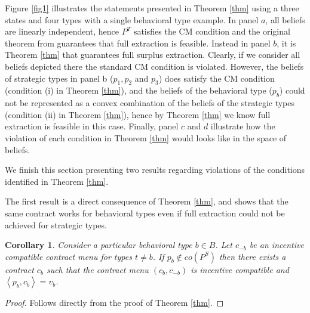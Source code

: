 \documentclass[12pt]{article}
\newtheorem{corollary}{Corollary}
\begin{document}
Figure \ref{fig1} illustrates the statements presented in Theorem \ref{thm} using a three states and four types with a single behavioral type example. In panel $a$, all beliefs are linearly independent, hence $P^T$ satisfies the CM condition and the original theorem from \citet{cremermclean1988} guarantees that full extraction is feasible. Instead in panel $b$, it is Theorem \ref{thm} that guarantees full surplus extraction. Clearly, if we consider all beliefs depicted there the standard CM condition is violated. However, the beliefs of strategic types in panel b ($p_1,p_2$ and $p_3$) does satisfy the CM condition (condition (i) in Theorem \ref{thm}), and the beliefs of the behavioral type ($p_b$) could not be represented as a convex combination of the beliefs of the strategic types (condition (ii) in Theorem \ref{thm}), hence by Theorem \ref{thm} we know full extraction is feasible in this case. Finally, panel $c$ and $d$ illustrate how the violation of each condition in Theorem \ref{thm} would looks like in the space of beliefs.


We finish this section presenting two results regarding violations of the conditions identified in Theorem \ref{thm}.


The first result is a direct consequence of Theorem \ref{thm}, and shows that the same contract works for behavioral types even if full extraction could not be achieved for strategic types.

\begin{corollary}\label{corollary}
	Consider a particular behavioral type $b\in B$. Let $c_{-b}$ be an incentive compatible contract menu for types $t\neq b$. If $p_b\not\in co(P^S)$ then there exists a contract $c_b$ such that the contract menu $(c_b,c_{-b})$ is incentive compatible and $\left<p_b,c_b\right>=v_b$.

\end{corollary}


	\begin{proof}
		Follows directly from the proof of Theorem \ref{thm}.
	\end{proof}
\end{document}
